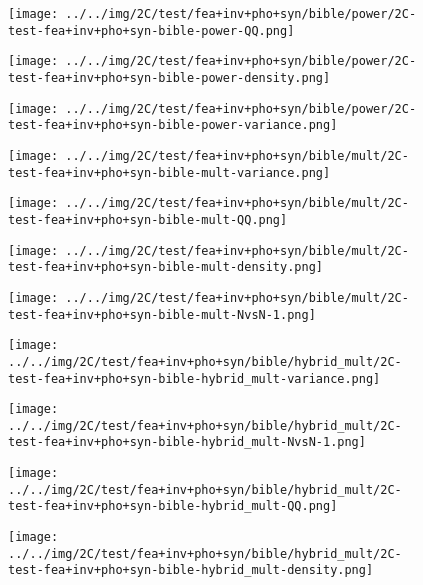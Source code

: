\begin{figure}[H]
\centering	\texttt{[image: ../../img/2C/test/fea+inv+pho+syn/bible/power/2C-test-fea+inv+pho+syn-bible-power-QQ.png]}
\end{figure}
\begin{figure}[H]
\centering	\texttt{[image: ../../img/2C/test/fea+inv+pho+syn/bible/power/2C-test-fea+inv+pho+syn-bible-power-density.png]}
\end{figure}
\begin{figure}[H]
\centering	\texttt{[image: ../../img/2C/test/fea+inv+pho+syn/bible/power/2C-test-fea+inv+pho+syn-bible-power-variance.png]}
\end{figure}
\begin{figure}[H]
\centering	\texttt{[image: ../../img/2C/test/fea+inv+pho+syn/bible/mult/2C-test-fea+inv+pho+syn-bible-mult-variance.png]}
\end{figure}
\begin{figure}[H]
\centering	\texttt{[image: ../../img/2C/test/fea+inv+pho+syn/bible/mult/2C-test-fea+inv+pho+syn-bible-mult-QQ.png]}
\end{figure}
\begin{figure}[H]
\centering	\texttt{[image: ../../img/2C/test/fea+inv+pho+syn/bible/mult/2C-test-fea+inv+pho+syn-bible-mult-density.png]}
\end{figure}
\begin{figure}[H]
\centering	\texttt{[image: ../../img/2C/test/fea+inv+pho+syn/bible/mult/2C-test-fea+inv+pho+syn-bible-mult-NvsN-1.png]}
\end{figure}
\begin{figure}[H]
\centering	\texttt{[image: ../../img/2C/test/fea+inv+pho+syn/bible/hybrid\_mult/2C-test-fea+inv+pho+syn-bible-hybrid\_mult-variance.png]}
\end{figure}
\begin{figure}[H]
\centering	\texttt{[image: ../../img/2C/test/fea+inv+pho+syn/bible/hybrid\_mult/2C-test-fea+inv+pho+syn-bible-hybrid\_mult-NvsN-1.png]}
\end{figure}
\begin{figure}[H]
\centering	\texttt{[image: ../../img/2C/test/fea+inv+pho+syn/bible/hybrid\_mult/2C-test-fea+inv+pho+syn-bible-hybrid\_mult-QQ.png]}
\end{figure}
\begin{figure}[H]
\centering	\texttt{[image: ../../img/2C/test/fea+inv+pho+syn/bible/hybrid\_mult/2C-test-fea+inv+pho+syn-bible-hybrid\_mult-density.png]}
\end{figure}
